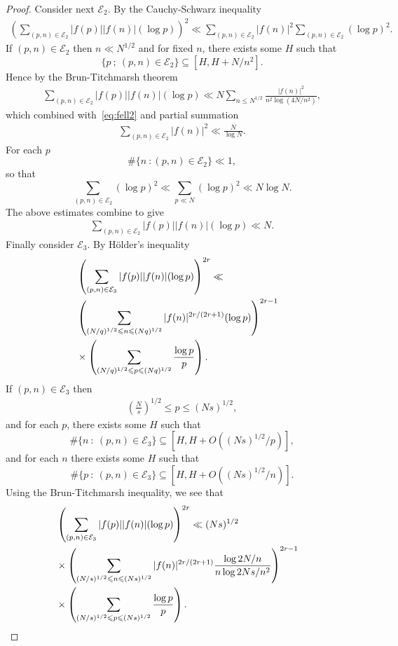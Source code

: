 \documentclass[12pt]{amsart}
\def\cE{{\mathcal E}}
\def\\{\cr}
\def\le{\leqslant}
\begin{document}
\begin{proof}
Consider next $\cE_2$. By the Cauchy-Schwarz inequality 
\begin{align*}
\left(\sum_{(p,n)\in \cE_2}|f(p)||f(n)|(\log{p})\right)^2\ll \sum_{(p,n)\in \cE_2}|f(n)|^2\sum_{(p,n)\in \cE_2}(\log{p})^2.
\end{align*}
If $(p,n)\in \cE_2$ then $n\ll N^{1/2}$ and for fixed $n$, there exists some $H$ such that 
$$\{ p \ ; \ (p,n)\in \cE_2\} \subseteq [H,H+N/n^2].$$
Hence by the Brun-Titchmarsh theorem 
\begin{align*}
\sum_{(p,n)\in \cE_2}|f(p)||f(n)|(\log{p})\ll N\sum_{n\le N^{1/2}}\frac{|f(n)|^2}{n^2\log{(4N/n^2)}},
\end{align*}
which combined with~\eqref{eq:fell2} and partial summation 
\begin{align*}
\sum_{(p,n)\in \cE_2}|f(n)|^2\ll \frac{N}{\log{N}}.
\end{align*}
For each $p$
$$\#\{ n \ : (p,n)\in \cE_2\} \ll 1,$$
so that 
$$\sum_{(p,n)\in \cE_2}(\log{p})^2\ll \sum_{p\ll N}(\log{p})^2 \ll N\log{N}.$$
The above estimates combine to give 
\begin{align*}
\sum_{(p,n)\in \cE_2}|f(p)||f(n)|(\log{p})\ll N.
\end{align*}
Finally consider $\cE_3$. By H\"{o}lder's inequality 
\begin{align*}
&\left(\sum_{(p,n)\in \cE_3}|f(p)||f(n)|(\log{p})\right)^{2r}\ll  \\ & \left(\sum_{(N/q)^{1/2}\le n\le (Nq)^{1/2}}|f(n)|^{2r/(2r+1)}(\log{p})\right)^{2r-1}\\ & \times \left(\sum_{(N/q)^{1/2}\le p\le (Nq)^{1/2}}\frac{\log{p}}{p}\right).
\end{align*}
 If $(p,n)\in \cE_3$ then 
\begin{align*}
\left(\frac{N}{s}\right)^{1/2}\le p \le (Ns)^{1/2},
\end{align*}
and for each $p$, there exists some $H$ such that 
$$\#\{ n \ : \ (p,n)\in \cE_3 \}\subseteq [H,H+O((Ns)^{1/2}/p)],$$
and for each $n$ there exists some $H$ such that 
$$\#\{ p \ : \ (p,n)\in \cE_3 \}\subseteq [H,H+O((Ns)^{1/2}/n)].$$
Using the Brun-Titchmarsh inequality, we see that
\begin{align*}
&\left(\sum_{(p,n)\in \cE_3}|f(p)||f(n)|(\log{p})\right)^{2r}\ll  (Ns)^{1/2} \\ & \times \left(\sum_{(N/s)^{1/2}\le n\le (Ns)^{1/2}}|f(n)|^{2r/(2r+1)}\frac{\log{2N/n}}{n\log{2Ns/n^2}}\right)^{2r-1}\\ & \times \left(\sum_{(N/s)^{1/2}\le p \le (Ns)^{1/2}}\frac{\log{p}}{p}\right).

\end{align*}
\end{proof}
\end{document}
